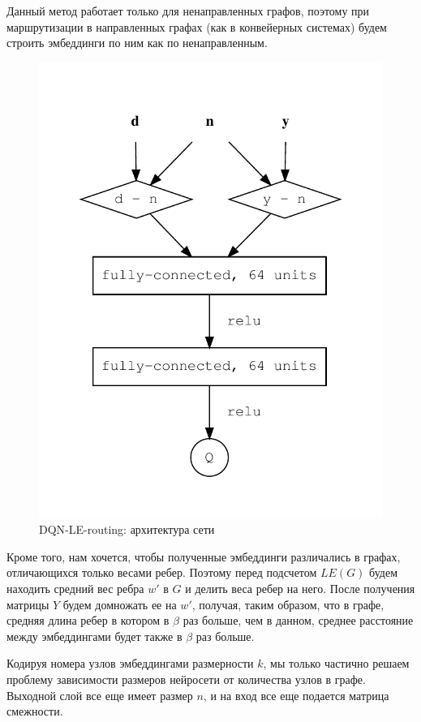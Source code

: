 \documentclass[specification,annotation,times]{itmo-student-thesis}
\theoremstyle{definition}
\begin{document}
Данный метод работает только для ненаправленных графов, поэтому при
маршрутизации в направленных графах (как в конвейерных системах) будем строить
эмбеддинги по ним как по ненаправленным.

\begin{figure}[!h]
  \caption{DQN-LE-routing: архитектура сети}\label{nn-1-one-out}
  \centering
  \includegraphics[scale=1]{nn-1-one-out}
\end{figure}

Кроме того, нам хочется, чтобы полученные эмбеддинги различались в графах,
отличающихся только весами ребер. Поэтому перед подсчетом $LE(G)$ будем находить
средний вес ребра $w'$ в $G$ и делить веса ребер на него. После получения
матрицы $Y$ будем домножать ее на $w'$, получая, таким образом, что в графе,
средняя длина ребер в котором в $\beta$ раз больше, чем в данном, среднее
расстояние между эмбеддингами будет также в $\beta$ раз больше.

Кодируя номера узлов эмбеддингами размерности $k$, мы только частично решаем
проблему зависимости размеров нейросети от количества узлов в графе. Выходной
слой все еще имеет размер $n$, и на вход все еще подается матрица смежности.
\end{document}
